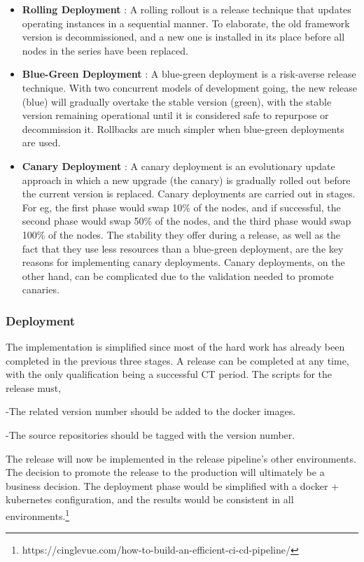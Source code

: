    \begin{itemize}
     \item \textbf{Rolling Deployment} :  A rolling rollout is a release technique that updates operating instances in a sequential manner. To elaborate, the old framework version is decommissioned, and a new one is installed in its place before all nodes in the series have been replaced.
     \item \textbf{Blue-Green Deployment} : A blue-green deployment is a risk-averse release technique. With two concurrent models of development going, the new release (blue) will gradually overtake the stable version (green), with the stable version remaining operational until it is considered safe to repurpose or decommission it. Rollbacks are much simpler when blue-green deployments are used.
     \item \textbf{Canary Deployment} :  A canary deployment is an evolutionary update approach in which a new upgrade (the canary) is gradually rolled out before the current version is replaced. Canary deployments are carried out in stages. For eg, the first phase would swap 10\% of the nodes, and if successful, the second phase would swap 50\% of the nodes, and the third phase would swap 100\% of the nodes. The stability they offer during a release, as well as the fact that they use less resources than a blue-green deployment, are the key reasons for implementing canary deployments. Canary deployments, on the other hand, can be complicated due to the validation needed to promote canaries.
   \end{itemize}


\subsubsection{Deployment}

The implementation is simplified since most of the hard work has already been completed in the previous three stages. A release can be completed at any time, with the only qualification being a successful CT period. The scripts for the release must,

\hspace{10mm} -The related version number should be added to the docker images.


\hspace{10mm} -The source repositories should be tagged with the version number.

The release will now be implemented in the release pipeline's other environments. The decision to promote the release to the production will ultimately be a business decision. The deployment phase would be simplified with a docker + kubernetes configuration, and the results would be consistent in all environments.\footnote{https://cinglevue.com/how-to-build-an-efficient-ci-cd-pipeline/}



